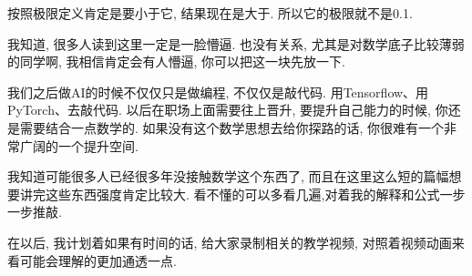 按照极限定义肯定是要小于它, 结果现在是大于. 所以它的极限就不是0.1. 

我知道, 很多人读到这里一定是一脸懵逼. 也没有关系, 尤其是对数学底子比较薄弱的同学啊, 我相信肯定会有人懵逼, 你可以把这一块先放一下.

我们之后做AI的时候不仅仅只是做编程, 不仅仅是敲代码. 用Tensorflow、用PyTorch、去敲代码. 以后在职场上面需要往上晋升, 要提升自己能力的时候, 你还是需要结合一点数学的. 如果没有这个数学思想去给你探路的话, 你很难有一个非常广阔的一个提升空间. 

我知道可能很多人已经很多年没接触数学这个东西了, 而且在这里这么短的篇幅想要讲完这些东西强度肯定比较大. 看不懂的可以多看几遍,对着我的解释和公式一步一步推敲. 

在以后, 我计划着如果有时间的话, 给大家录制相关的教学视频, 对照着视频动画来看可能会理解的更加通透一点. 